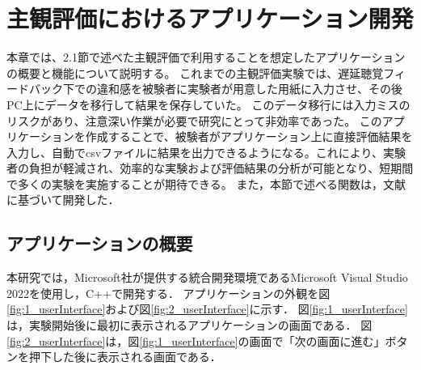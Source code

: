 \chapter{主観評価におけるアプリケーション開発}
本章では、2.1節で述べた主観評価で利用することを想定したアプリケーションの概要と機能について説明する。
これまでの主観評価実験では、遅延聴覚フィードバック下での違和感を被験者に実験者が用意した用紙に入力させ、その後PC上にデータを移行して結果を保存していた。
このデータ移行には入力ミスのリスクがあり、注意深い作業が必要で研究にとって非効率であった。
このアプリケーションを作成することで、被験者がアプリケーション上に直接評価結果を入力し、自動でcsvファイルに結果を出力できるようになる。これにより、実験者の負担が軽減され、効率的な実験および評価結果の分析が可能となり、短期間で多くの実験を実施することが期待できる。
また，本節で述べる関数は，文献\cite{Win32API-reference}に基づいて開発した．

\section{アプリケーションの概要}
本研究では，Microsoft社が提供する統合開発環境であるMicrosoft Visual Studio 2022を使用し，C++で開発する．
アプリケーションの外観を図\ref{fig:1_userInterface}および図\ref{fig:2_userInterface}に示す．
図\ref{fig:1_userInterface}は，実験開始後に最初に表示されるアプリケーションの画面である．
図\ref{fig:2_userInterface}は，図\ref{fig:1_userInterface}の画面で「次の画面に進む」ボタンを押下した後に表示される画面である．

